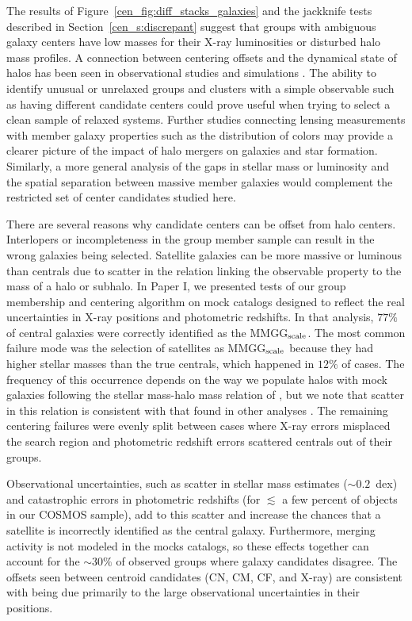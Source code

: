 The results of Figure~\ref{cen_fig:diff_stacks_galaxies} and the jackknife
tests described in Section~\ref{cen_s:discrepant} suggest that groups with
ambiguous galaxy centers have low masses for their X-ray
  luminosities or disturbed halo mass profiles. A
connection between centering offsets and the dynamical state of halos
has been seen in observational studies \citep[e.g.,][]{Forman1982,
  Katayama2003, Sanderson2009} and simulations
\citep[e.g.,][]{Cohn2005, Poole2006, Maccio2007, Neto2007,
  SkibbaMaccio2011}. The ability to identify unusual
  or unrelaxed groups and
clusters with a simple observable such as having different candidate
centers could prove useful when trying to select a clean sample of
relaxed systems. Further studies connecting lensing measurements with
member galaxy properties such as the distribution of colors may
provide a clearer picture of the impact of halo mergers on galaxies
and star formation. Similarly, a more general analysis of the gaps in
stellar mass or luminosity and the spatial separation between massive
member galaxies would complement the restricted set of center
candidates studied here.

There are several reasons why candidate centers can be offset from
halo centers. Interlopers or incompleteness in the group member sample
can result in the wrong galaxies being selected. Satellite galaxies
can be more massive or luminous than centrals due to scatter in the
relation linking the observable property to the mass of a halo or
subhalo. In Paper I, we presented tests of our group membership and
centering algorithm on mock catalogs designed to reflect the real
uncertainties in X-ray positions and photometric redshifts. In that
analysis, $77\%$ of central galaxies were correctly identified as the
MMGG$_{\rm scale}$.  The most common failure mode was the selection of
satellites as MMGG$_{\rm scale}$ because they had higher stellar
masses than the true centrals, which happened in $12\%$ of
cases. The frequency of this occurrence depends on the
  way we populate halos with mock galaxies following the stellar
  mass-halo mass relation of \citet{Leauthaud2012}, but we note that
  scatter in this relation is consistent with that found in other
  analyses \citep{Yang2009, More2009, Reddick2012}. The remaining
centering failures were evenly split between cases where X-ray errors
misplaced the search region and photometric redshift errors scattered
centrals out of their groups.

Observational uncertainties, such as scatter in stellar mass estimates
($\sim0.2$~{\rm dex}) and catastrophic errors in photometric redshifts
(for $\lesssim$ a few percent of objects in our COSMOS sample), add to
this scatter and increase the chances that a satellite is incorrectly
identified as the central galaxy. Furthermore, merging activity is not
modeled in the mocks catalogs, so these effects together can account
for the $\sim30\%$ of observed groups where galaxy candidates
disagree. The offsets seen between centroid candidates (CN, CM, CF,
and X-ray) are consistent with being due primarily to the large
observational uncertainties in their positions.

